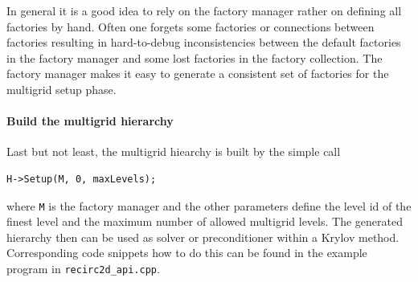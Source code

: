 \documentclass[12pt,a4paper]{article}
\begin{document}
In general it is a good idea to rely on the factory manager rather on defining all factories by hand. Often one forgets some factories or connections between factories resulting in hard-to-debug inconsistencies between the default factories in the factory manager and some lost factories in the factory collection. The factory manager makes it easy to generate a consistent set of factories for the multigrid setup phase.

\paragraph{Build the multigrid hierarchy}
Last but not least, the multigrid hiearchy is built by the simple call
\begin{verbatim}
H->Setup(M, 0, maxLevels);
\end{verbatim}
where \verb|M| is the factory manager and the other parameters define the level id of the finest level and the maximum number of allowed multigrid levels.
The generated hierarchy then can be used as solver or preconditioner within a Krylov method. Corresponding code snippets how to do this can be found in the example program in \verb|recirc2d_api.cpp|.
\end{document}
